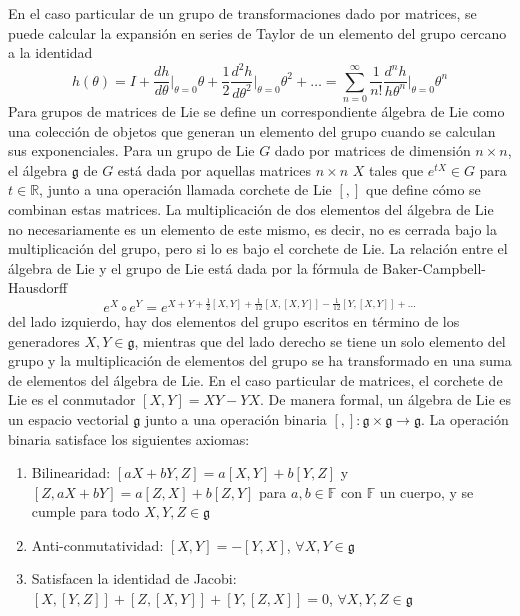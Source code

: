 En el caso particular de un grupo de transformaciones dado por matrices, se puede calcular la expansión en series de Taylor de un elemento del grupo cercano a la identidad
\begin{equation*}
  h(\theta) = I + \frac{dh}{d\theta}\bigg|_{\theta=0}\theta + \frac{1}{2}\frac{d^2h}{d\theta^2}\bigg|_{\theta=0}\theta^2 + \dots = \sum_{n=0}^{\infty} \frac{1}{n!}\frac{d^n h}{h\theta^n}\bigg|_{\theta=0}\theta^n
\end{equation*}
Para grupos de matrices de Lie se define un correspondiente álgebra de Lie como una colección de objetos que generan un elemento del grupo cuando se calculan sus exponenciales. Para un grupo de Lie $G$ dado por matrices de dimensión $n\times n$, el álgebra $\mathfrak{g}$ de $G$ está dada por aquellas matrices $n\times n$ $X$ tales que $e^{tX}\in G$ para $t\in \mathbb{R}$, junto a una operación llamada corchete de Lie $[,]$ que define cómo se combinan estas matrices. La multiplicación de dos elementos del álgebra de Lie no necesariamente es un elemento de este mismo, es decir, no es cerrada bajo la multiplicación del grupo, pero si lo es bajo el corchete de Lie. La relación entre el álgebra de Lie y el grupo de Lie está dada por la fórmula de Baker-Campbell-Hausdorff
\begin{equation*}
  e^X \circ e^Y = e^{X+Y+\frac{1}{2}[X,Y] + \frac{1}{12}[X,[X,Y]] - \frac{1}{12}[Y,[X,Y]] + \dots}
\end{equation*}
del lado izquierdo, hay dos elementos del grupo escritos en término de los generadores $X,Y\in \mathfrak{g}$, mientras que del lado derecho se tiene un solo elemento del grupo y la multiplicación de elementos del grupo se ha transformado en una suma de elementos del álgebra de Lie. En el caso particular de matrices, el corchete de Lie es el conmutador $[X,Y] = XY-YX$.
De manera formal, un álgebra de Lie es un espacio vectorial $\mathfrak{g}$ junto a una operación binaria $[,]:\mathfrak{g}\times \mathfrak{g} \to \mathfrak{g}$. La operación binaria satisface los siguientes axiomas:
\begin{enumerate}
  \item Bilinearidad: $[aX + bY, Z] = a[X,Y] + b[Y, Z]$ y $[Z, aX + bY] = a[Z,X] + b[Z,Y]$ para $a,b\in \mathbb{F}$ con $\mathbb{F}$ un cuerpo, y se cumple para todo $X,Y,Z\in \mathfrak{g}$
  \item Anti-conmutatividad: $[X,Y] = -[Y,X]$, $\forall X, Y \in \mathfrak{g}$
  \item Satisfacen la identidad de Jacobi: $[X, [Y,Z]] + [Z,[X,Y]] + [Y,[Z,X]] = 0$, $\forall X,Y,Z\in \mathfrak{g}$
\end{enumerate}
